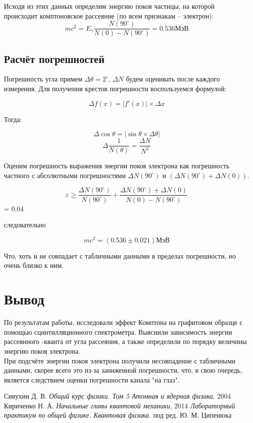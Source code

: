 \documentclass[a4paper,12pt]{article} %
\renewcommand{\epsilon}{\varepsilon}            %
\begin{document}
Исходя из этих данных определим энергию покоя частицы, на которой происходит комптоновское рассеяние (по всем признакам -- электрон):
\[m c^2 = E_\gamma \dfrac{N(90^\circ)}{N(0)-N(90^\circ)} = 0.536 \text{МэВ}\]

\subsection * {Расчёт погрешностей}

Погрешность угла примем $\Delta \theta = 2 ^ \circ$, $\Delta N$ будем оценивать после каждого измерения. Для получения крестов погрешности воспользуемся формулой:

\[\Delta f(x) = |f'(x)| \times \Delta x\]

Тогда:

\[\Delta \cos{\theta} = |\sin{\theta} \times \Delta \theta|\]
\[ \Delta \dfrac{1}{N(\theta)} = \dfrac{\Delta N}{N^2}\]

Оценим погрешность выражения энергии покоя электрона как погрешность частного с абсолютными погрешностями $\Delta N(90 ^ \circ)$ и $(\Delta N(90 ^ \circ) + \Delta N(0))$.

\[ \epsilon \geq \dfrac{\Delta N(90 ^ \circ)}{N(90 ^ \circ)} + \dfrac{\Delta N(90 ^ \circ) + \Delta N(0)}{N(0) - N(90 ^ \circ)}\] = 0.04

следовательно

\[ mc^2 = (0.536 \pm 0.021) \text{МэВ} \]

Что, хоть и не совпадает с табличными данными в пределах погрешности, но очень близко к ним.


\section * {Вывод}

По результатам работы, исследовали эффект Комптона на графитовом образце с помощью сцинтилляционного спектрометра. Выяснили зависимость  энергии рассеянного \gmm-кванта от угла рассеяния, а также определили по порядку величины энергию покоя электрона. \\

При подсчёте энергии покоя электрона получили несовпадение с табличными данными, скорее всего это из-за заниженной погрешности, что, в свою очередь, является следствием оценки погрешности канала "на глаз".



\begin{thebibliography}{9}
	 Сивухин Д. В. \emph{Общий курс физики. Том 5 Атомная и ядерная физика}, 2004
	 Кириченко Н. А. \emph{Начальные главы квантовой механики}, 2014
	 \emph{Лабораторный практикум по общей физике. Квантовая физика.} под ред. Ю. М. Ципенюка
\end{thebibliography}
\end{document}
